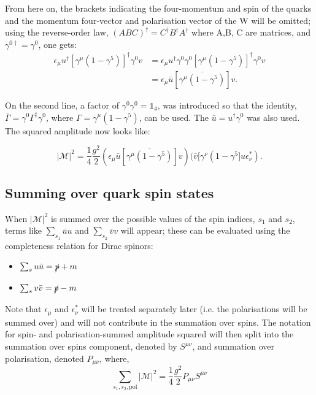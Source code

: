 \documentclass[a4paper,11pt]{article}
\begin{document}
  From here on, the brackets indicating the four-momentum and spin of the quarks and the momentum four-vector and polarisation vector of the W will be omitted; using the reverse-order law, $(ABC)^\dagger = C^\dagger B^\dagger A^\dagger$ where A,B, C are matrices, and $\gamma^{0 \dagger} = \gamma^0$,  one gets:
 \begin{equation}\label{gamma_id}
 	\begin{aligned}
 		 	\epsilon_\mu u^\dagger \left[\gamma^\mu (1-\gamma^5)\right]^\dagger \gamma^0 v &= \epsilon_\mu u^\dagger \gamma^0 \gamma^0 \left[\gamma^\mu (1-\gamma^5)\right]^\dagger \gamma^0 v \\
 		&= \epsilon_\mu \bar{u}[\overline{\gamma^\mu (1-\gamma^5)}] v.
 	\end{aligned}
 \end{equation}

 
 On the second line, a factor of $\gamma^0 \gamma^0 = \mathds{1}_4$, was introduced so that the identity, $\bar{\Gamma}= \gamma^0 \Gamma^\dagger \gamma^0$, where $\Gamma = \gamma^\mu (1-\gamma^5)$, can be used. The $\bar{u}=u^\dagger \gamma^0$ was also used. The squared amplitude now looks like:
 
 \begin{equation}\label{msquared}
 	|\mathcal{M}|^2 = \frac{1}{4} \frac{g^2}{2} (\epsilon_\mu \bar{u}[\overline{\gamma^\mu (1-\gamma^5)}]v)(\bar{v}[\gamma^\nu (1-\gamma^5] u \epsilon_\nu^*).
 \end{equation}
 
 \subsection{Summing over quark spin states}\label{completeness}
 When $|\mathcal{M}|^2 $ is summed over the possible values of the spin indices, $s_1$ and $s_2$, terms like $\sum_{s_1} \bar{u}u$ and $\sum_{s_2} \bar{v}v$ will appear; these can be evaluated using the completeness relation for Dirac spinors: %
 \begin{itemize}
 	\item $\sum_{s}u\bar{u} =  \slashed{p}+m  $
 	\item $\sum_{s}v\bar{v} =  \slashed{p}-m  $
 \end{itemize}
 Note that $\epsilon_{\mu}$ and $\epsilon_{\nu}^*$ will be treated separately later (i.e. the polarisations will be summed over) and will not contribute in the summation over spins. The notation for spin- and polarisation-summed amplitude squared will then split into the summation over spins component, denoted by $S^{\mu\nu}$, and summation over polarisation, denoted $P_{\mu \nu}$, where, $$\sum_{s_1, s_2, \text{pol}}|\mathcal{M}|^2=  \frac{1}{4} \frac{g^2}{2}P_{\mu\nu}S^{\mu\nu} $$\\
 
\end{document}
